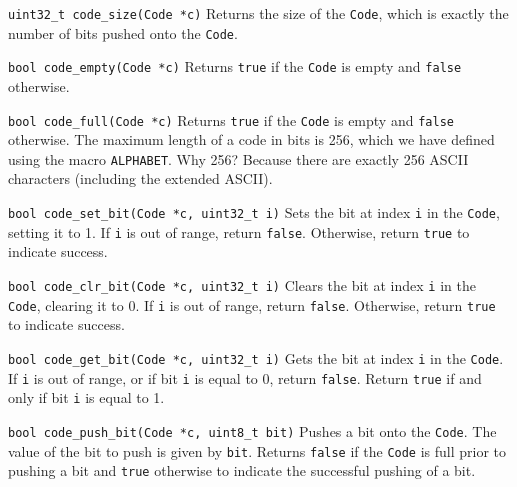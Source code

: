 \begin{funcdoc}{\texttt{uint32\_t code\_size(Code *c)}}
  Returns the size of the \texttt{Code}, which is exactly the number of
  bits pushed onto the \texttt{Code}.
\end{funcdoc}

\begin{funcdoc}{\texttt{bool code\_empty(Code *c)}}
  Returns \texttt{true} if the \texttt{Code} is empty and \texttt{false}
  otherwise.
\end{funcdoc}

\begin{funcdoc}{\texttt{bool code\_full(Code *c)}}
  Returns \texttt{true} if the \texttt{Code} is empty and \texttt{false}
  otherwise. The maximum length of a code in bits is 256, which we have
  defined using the macro \texttt{ALPHABET}. Why 256? Because there are
  exactly 256 ASCII characters (including the extended ASCII).
\end{funcdoc}

\begin{funcdoc}{\texttt{bool code\_set\_bit(Code *c, uint32\_t i)}}
  Sets the bit at index \texttt{i} in the \texttt{Code}, setting it to
  1. If \texttt{i} is out of range, return \texttt{false}. Otherwise,
  return \texttt{true} to indicate success.
\end{funcdoc}

\begin{funcdoc}{\texttt{bool code\_clr\_bit(Code *c, uint32\_t i)}}
  Clears the bit at index \texttt{i} in the \texttt{Code}, clearing it
  to 0. If \texttt{i} is out of range, return \texttt{false}. Otherwise,
  return \texttt{true} to indicate success.
\end{funcdoc}

\begin{funcdoc}{\texttt{bool code\_get\_bit(Code *c, uint32\_t i)}}
  Gets the bit at index \texttt{i} in the \texttt{Code}. If \texttt{i}
  is out of range, or if bit \texttt{i} is equal to 0, return
  \texttt{false}. Return \texttt{true} if and only if bit \texttt{i} is
  equal to 1.
\end{funcdoc}

\begin{funcdoc}{\texttt{bool code\_push\_bit(Code *c, uint8\_t bit)}}
  Pushes a bit onto the \texttt{Code}. The value of the bit to push is
  given by \texttt{bit}. Returns \texttt{false} if the \texttt{Code} is
  full prior to pushing a bit and \texttt{true} otherwise to indicate
  the successful pushing of a bit.
\end{funcdoc}

